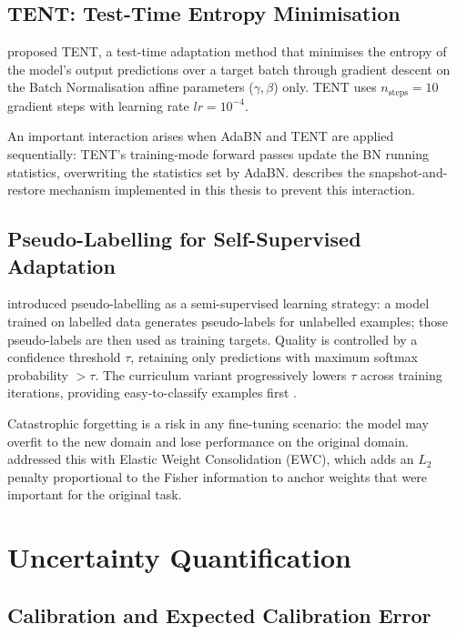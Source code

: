 \subsection{TENT: Test-Time Entropy Minimisation}

\citet{wang2021tent} proposed TENT, a test-time adaptation method that
minimises the entropy of the model's output predictions over a target batch
through gradient descent on the Batch Normalisation affine parameters
($\gamma, \beta$) only.
TENT uses $n_{\text{steps}} = 10$ gradient steps with learning rate
$lr = 10^{-4}$.

An important interaction arises when AdaBN and TENT are applied sequentially:
TENT's training-mode forward passes update the BN running statistics, overwriting
the statistics set by AdaBN.
 describes the snapshot-and-restore mechanism implemented
in this thesis to prevent this interaction.

\subsection{Pseudo-Labelling for Self-Supervised Adaptation}

\citet{lee2013pseudo} introduced pseudo-labelling as a semi-supervised learning
strategy: a model trained on labelled data generates pseudo-labels for unlabelled
examples; those pseudo-labels are then used as training targets.
Quality is controlled by a confidence threshold $\tau$, retaining only
predictions with maximum softmax probability $> \tau$.
The curriculum variant progressively lowers $\tau$ across training iterations,
providing easy-to-classify examples first \citep{lee2013pseudo}.

Catastrophic forgetting is a risk in any fine-tuning scenario: the model may
overfit to the new domain and lose performance on the original domain.
\citet{kirkpatrick2017overcoming} addressed this with Elastic Weight
Consolidation (EWC), which adds an $L_2$ penalty proportional to the Fisher
information to anchor weights that were important for the original task.

\section{Uncertainty Quantification}
\label{sec:bg_uq}

\subsection{Calibration and Expected Calibration Error}

